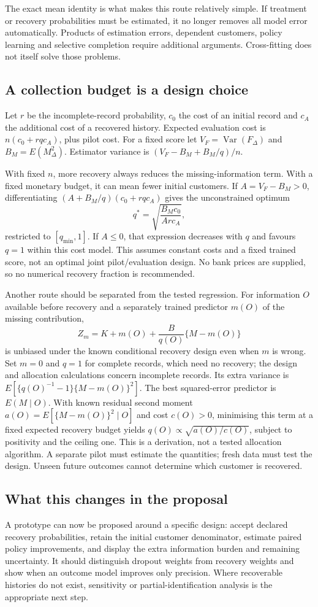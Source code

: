 The exact mean identity is what makes this route relatively simple. If
treatment or recovery probabilities must be estimated, it no longer removes
all model error automatically. Products of estimation errors, dependent
customers, policy learning and selective completion require additional
arguments. Cross-fitting does not itself solve those problems.

\subsection{A collection budget is a design choice}
Let $r$ be the incomplete-record probability, $c_0$ the cost of an initial
record and $c_A$ the additional cost of a recovered history. Expected
evaluation cost is $n(c_0+rqc_A)$, plus pilot cost. For a fixed score let
$V_F=\operatorname{Var}(F_\Delta)$ and $B_M=E(M_\Delta^2)$. Estimator
variance is $(V_F-B_M+B_M/q)/n$.

With fixed $n$, more recovery always reduces the missing-information term.
With a fixed monetary budget, it can mean fewer initial customers. If
$A=V_F-B_M>0$, differentiating
$(A+B_M/q)(c_0+rqc_A)$ gives the unconstrained optimum
\[
q^*=\sqrt{\frac{B_Mc_0}{A r c_A}},
\]
restricted to $[q_{\min},1]$. If $A\leq0$, that expression decreases with
$q$ and favours $q=1$ within this cost model. This assumes constant costs
and a fixed trained score, not an optimal joint pilot/evaluation design.
No bank prices are supplied, so no numerical recovery fraction is recommended.

Another route should be separated from the tested regression. For information
$O$ available before recovery and a separately trained predictor $m(O)$ of
the missing contribution,
\[
Z_m=K+m(O)+\frac{B}{q(O)}\{M-m(O)\}
\]
is unbiased under the known conditional recovery design even when $m$ is
wrong. Set $m=0$ and $q=1$ for complete records, which need no recovery; the design
and allocation calculations concern incomplete records. Its extra variance is
$E[\{q(O)^{-1}-1\}\{M-m(O)\}^2]$.
The best squared-error predictor is $E(M\mid O)$. With known residual
second moment $a(O)=E[\{M-m(O)\}^2\mid O]$ and cost $c(O)>0$, minimising
this term at a fixed expected recovery budget yields
$q(O)\propto\sqrt{a(O)/c(O)}$, subject to positivity and the ceiling one.
This is a derivation, not a tested allocation algorithm. A separate pilot
must estimate the quantities; fresh data must test the design. Unseen
future outcomes cannot determine which customer is recovered.

\subsection{What this changes in the proposal}
A prototype can now be proposed around a specific design: accept declared
recovery probabilities, retain the initial customer denominator, estimate
paired policy improvements, and display the extra information burden and
remaining uncertainty. It should distinguish dropout weights from recovery
weights and show when an outcome model improves only precision. Where
recoverable histories do not exist, sensitivity or partial-identification
analysis is the appropriate next step.

